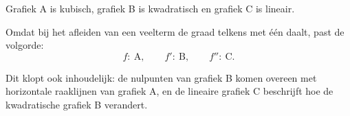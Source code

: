 \documentclass{ximera}
\begin{document}
\begin{oefening}{\oefU\ESS}
\begin{oplossing}
Grafiek A is kubisch, grafiek B is kwadratisch en grafiek C is lineair.

Omdat bij het afleiden van een veelterm de graad telkens met één daalt,
past de volgorde:
\[
\boxed{f:\ \text{A}},
\qquad
\boxed{f':\ \text{B}},
\qquad
\boxed{f'':\ \text{C}}.
\]

Dit klopt ook inhoudelijk: de nulpunten van grafiek B komen overeen met
horizontale raaklijnen van grafiek A, en de lineaire grafiek C beschrijft
hoe de kwadratische grafiek B verandert.

\end{oplossing}

\end{oefening}


\end{document}
